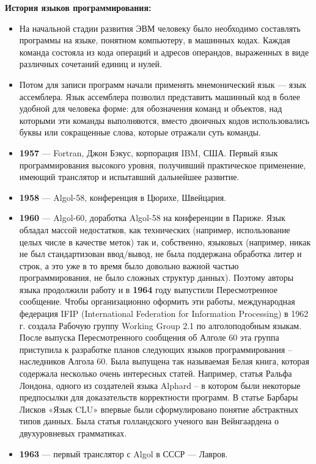 \documentclass[12pt, a4paper]{article}
\begin{document}
\textbf{История языков программирования:}

\begin{itemize}
    \item На начальной стадии развития ЭВМ человеку было необходимо составлять программы на языке, понятном компьютеру, в машинных кодах. Каждая команда состояла из кода операций и адресов операндов, выраженных в виде различных сочетаний единиц и нулей.
    \item Потом для записи программ начали применять мнемонический язык — язык ассемблера. Язык ассемблера позволил представить машинный код в более удобной для человека форме: для обозначения команд и объектов, над которыми эти команды выполняются, вместо двоичных кодов использовались буквы или сокращенные слова, которые отражали суть команды.
    \item \textbf{1957} --- Fortran, Джон Бэкус, корпорация IBM, США. Первый язык программирования высокого уровня, получивший практическое применение, имеющий транслятор и испытавший дальнейшее развитие.
    \item \textbf{1958} --- Algol-58, конференция в Цюрихе, Швейцария.
    \item \textbf{1960} --- Algol-60, доработка Algol-58 на конференции в Париже. Язык обладал массой недостатков, как технических (например, использование целых числе в качестве меток) так и, собственно, языковых (например, никак не был стандартизован ввод/вывод, не была поддержана обработка литер и строк, а это уже в то время было довольно важной частью программирования, не было сложных структур данных). Поэтому авторы языка продолжили работу и в \textbf{1964} году выпустили Пересмотренное сообщение. Чтобы организационно оформить эти работы, международная федерация IFIP (International Federation for Information Processing) в 1962 г. создала Рабочую группу Working Group 2.1 по алголоподобным языкам. После выпуска Пересмотренного сообщения об Алголе 60 эта группа приступила к разработке планов следующих языков программирования – наследников Алгола 60. Была выпущена так называемая Белая книга, которая содержала несколько очень интересных статей. Например, статья Ральфа Лондона, одного из создателей языка Alphard – в котором были некоторые предпосылки для доказательств корректности программ. В статье Барбары Лисков «Язык CLU» впервые были сформулировано понятие абстрактных типов данных. Была статья голландского ученого ван Вейнгаардена о двухуровневых грамматиках.
    \item \textbf{1963} --- первый транслятор с Algol в СССР --- Лавров.

\end{itemize}
\end{document}
